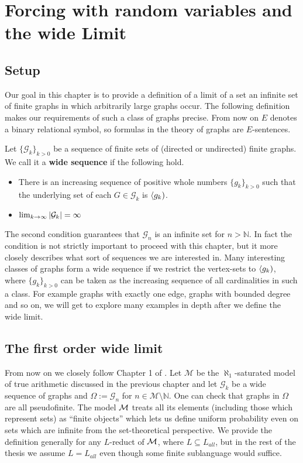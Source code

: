 \chapter{Forcing with random variables and the wide Limit}\label{chapwidelimit}
\section{Setup}

Our goal in this chapter is to provide a definition of a limit of a set an infinite set of finite graphs in which arbitrarily large graphs occur. The following definition makes our requirements of such a class of graphs precise. From now on $E$ denotes a binary relational symbol, so formulas in the theory of graphs are $E$-sentences.

\begin{defi}
Let $\{\mathcal{G}_k\}_{k>0}$ be a sequence of finite sets of (directed or undirected) finite graphs. We call it a \textbf{wide sequence} if the following hold.

\begin{itemize}
\item There is an increasing sequence of positive whole numbers $\{g_k\}_{k>0}$ such that the underlying set of each $G\in\mathcal{G}_k$ is $\langle g_k)$.
\item $\lim_{k\to\infty} \left|{\mathcal{G}_k}\right|=\infty$
\end{itemize}
\end{defi}

The second condition guarantees that $\mathcal{G}_n$ is an infinite set for $n>\mathbb{N}$. In fact the condition is not strictly important to proceed with this chapter, but it more closely describes what sort of sequences we are interested in. Many interesting classes of graphs form a wide sequence if we restrict the vertex-sets to $\langle g_k)$, where $\{g_k\}_{k>0}$ can be taken as the increasing sequence of all cardinalities in such a class. For example graphs with exactly one edge, graphs with bounded degree and so on, we will get to explore many examples in depth after we define the wide limit.

\section{The first order wide limit}

From now on we closely follow Chapter 1 of \cite{krajicek2010forcing}. Let $\mathcal{M}$ be the $\aleph_1$-saturated model of true arithmetic discussed in the previous chapter and let $\mathcal{G}_k$ be a wide sequence of graphs and $\Omega:=\mathcal{G}_n$ for $n\in\mathcal{M}\setminus \mathbb{N}$. One can check that graphs in $\Omega$ are all pseudofinite. The model $\mathcal{M}$ treats all its elements (including those which represent sets) as ``finite objects'' which lets us define uniform probability even on sets which are infinite from the set-theoretical perspective. We provide the definition generally for any $L$-reduct of $\mathcal{M}$, where $L\subseteq L_{all}$, but in the rest of the thesis we assume $L=L_{all}$ even though some finite sublanguage would suffice.


